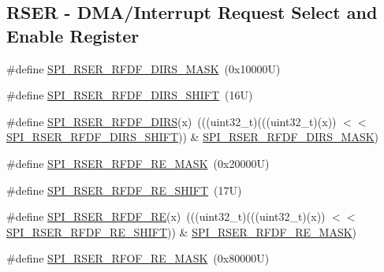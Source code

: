 \subsection*{R\+S\+ER -\/ D\+M\+A/\+Interrupt Request Select and Enable Register}
\begin{DoxyCompactItemize}
\item 
\#define \mbox{\hyperlink{group___s_p_i___register___masks_ga10709e9e15464e94d63f2034df58cd32}{S\+P\+I\+\_\+\+R\+S\+E\+R\+\_\+\+R\+F\+D\+F\+\_\+\+D\+I\+R\+S\+\_\+\+M\+A\+SK}}~(0x10000\+U)
\item 
\#define \mbox{\hyperlink{group___s_p_i___register___masks_ga1abe68cebab13a4018f43162098e4cd6}{S\+P\+I\+\_\+\+R\+S\+E\+R\+\_\+\+R\+F\+D\+F\+\_\+\+D\+I\+R\+S\+\_\+\+S\+H\+I\+FT}}~(16\+U)
\item 
\#define \mbox{\hyperlink{group___s_p_i___register___masks_gac0822dc99c670f67d28ee973bc6dd9ec}{S\+P\+I\+\_\+\+R\+S\+E\+R\+\_\+\+R\+F\+D\+F\+\_\+\+D\+I\+RS}}(x)~(((uint32\+\_\+t)(((uint32\+\_\+t)(x)) $<$$<$ \mbox{\hyperlink{group___s_p_i___register___masks_ga1abe68cebab13a4018f43162098e4cd6}{S\+P\+I\+\_\+\+R\+S\+E\+R\+\_\+\+R\+F\+D\+F\+\_\+\+D\+I\+R\+S\+\_\+\+S\+H\+I\+FT}})) \& \mbox{\hyperlink{group___s_p_i___register___masks_ga10709e9e15464e94d63f2034df58cd32}{S\+P\+I\+\_\+\+R\+S\+E\+R\+\_\+\+R\+F\+D\+F\+\_\+\+D\+I\+R\+S\+\_\+\+M\+A\+SK}})
\item 
\#define \mbox{\hyperlink{group___s_p_i___register___masks_ga5b78af7a1292fc0e0b4b39a92a4140b2}{S\+P\+I\+\_\+\+R\+S\+E\+R\+\_\+\+R\+F\+D\+F\+\_\+\+R\+E\+\_\+\+M\+A\+SK}}~(0x20000\+U)
\item 
\#define \mbox{\hyperlink{group___s_p_i___register___masks_ga39481cbcda158bbfc6640eb07d0c2276}{S\+P\+I\+\_\+\+R\+S\+E\+R\+\_\+\+R\+F\+D\+F\+\_\+\+R\+E\+\_\+\+S\+H\+I\+FT}}~(17\+U)
\item 
\#define \mbox{\hyperlink{group___s_p_i___register___masks_ga220c88340bd372ec2b1a91557caac1b6}{S\+P\+I\+\_\+\+R\+S\+E\+R\+\_\+\+R\+F\+D\+F\+\_\+\+RE}}(x)~(((uint32\+\_\+t)(((uint32\+\_\+t)(x)) $<$$<$ \mbox{\hyperlink{group___s_p_i___register___masks_ga39481cbcda158bbfc6640eb07d0c2276}{S\+P\+I\+\_\+\+R\+S\+E\+R\+\_\+\+R\+F\+D\+F\+\_\+\+R\+E\+\_\+\+S\+H\+I\+FT}})) \& \mbox{\hyperlink{group___s_p_i___register___masks_ga5b78af7a1292fc0e0b4b39a92a4140b2}{S\+P\+I\+\_\+\+R\+S\+E\+R\+\_\+\+R\+F\+D\+F\+\_\+\+R\+E\+\_\+\+M\+A\+SK}})
\item 
\#define \mbox{\hyperlink{group___s_p_i___register___masks_ga32d8083bb571fb12a424b1803c596f47}{S\+P\+I\+\_\+\+R\+S\+E\+R\+\_\+\+R\+F\+O\+F\+\_\+\+R\+E\+\_\+\+M\+A\+SK}}~(0x80000\+U)

\end{DoxyCompactItemize}
